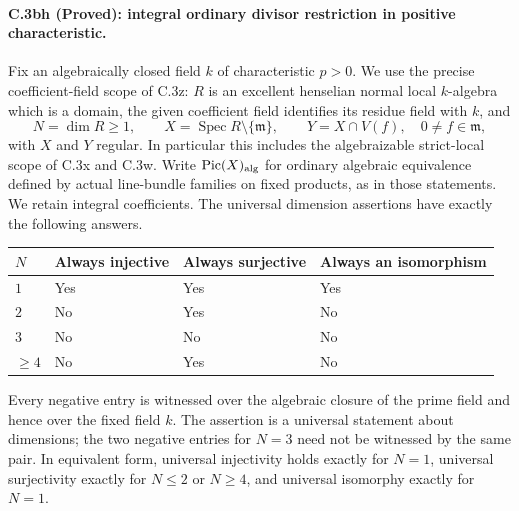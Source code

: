 \paragraph{C.3bh (Proved): integral ordinary divisor restriction in positive characteristic.}
Fix an algebraically closed field $k$ of characteristic $p>0$.
We use the precise coefficient-field scope of C.3z: $R$ is an
excellent henselian normal local $k$-algebra which is a domain,
the given coefficient field identifies its residue field with $k$,
and
\[
 N=\dim R\ge1,\qquad
 X=\operatorname{Spec}R\setminus\{\mathfrak m\},\qquad
 Y=X\cap V(f),\quad 0\ne f\in\mathfrak m,
\]
with $X$ and $Y$ regular. In particular this includes the
algebraizable strict-local scope of C.3x and C.3w.
Write $\operatorname{Pic}(X)_{\rm alg}$ for ordinary algebraic
equivalence defined by actual line-bundle families on fixed
products, as in those statements. We retain integral coefficients.
The universal dimension assertions have exactly the following answers.

\begin{center}
\begin{tabular}{llll}
\toprule
$N$ & Always injective & Always surjective & Always an isomorphism\\
\midrule
$1$ & Yes & Yes & Yes\\
$2$ & No & Yes & No\\
$3$ & No & No & No\\
$\ge4$ & No & Yes & No\\
\bottomrule
\end{tabular}
\end{center}

Every negative entry is witnessed over the algebraic closure of the
prime field and hence over the fixed field $k$. The assertion is a
universal statement about dimensions; the two negative entries for
$N=3$ need not be witnessed by the same pair. In equivalent form,
universal injectivity holds exactly for $N=1$, universal surjectivity
exactly for $N\le2$ or $N\ge4$, and universal isomorphy exactly for
$N=1$.

